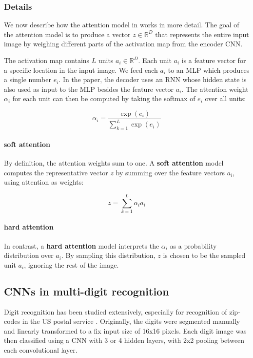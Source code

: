 \subsubsection{Details}
We now describe how the attention model in \cite{AttendAndTell} works in more detail.
The goal of the attention model is to produce a vector $z \in \mathbb{R}^D$ that represents the entire input image by weighing different parts of the activation map from the encoder CNN.

The activation map contains $L$ units $a_i \in \mathbb{R}^D$.
Each unit $a_i$ is a feature vector for a specific location in the input image. We feed each $a_i$ to an MLP which produces a single number $e_i$. In the paper, the decoder uses an RNN whose hidden state is also used as input to the MLP besides the feature vector $a_i$.
The attention weight $\alpha_i$ for each unit can then be computed by taking the softmax of $e_i$ over all units:

\[
\alpha_i = \frac{ \exp(e_i) }{ \sum_{k=1}^L \exp(e_i) }
\]

\paragraph{soft attention}
By definition, the attention weights sum to one. A \textbf{soft attention} model computes the representative vector $z$ by summing over the feature vectors $a_i$, using attention as weights:

\[
z = \sum_{k=1}^L \alpha_i a_i
\]

\paragraph{hard attention}
In contrast, a \textbf{hard attention} model interprets the $\alpha_i$ as a probability distribution over $a_i$. By sampling this distribution, $z$ is chosen to be the sampled unit $a_i$, ignoring the rest of the image.


\subsection{CNNs in multi-digit recognition}

Digit recognition has been studied extensively, especially for recognition of zip-codes in the US postal service \cite{lecun_1989, lecun_1990}. Originally, the digits were segmented manually and linearly transformed to a fix input size of 16x16 pixels.
Each digit image was then classified using a CNN with 3 or 4 hidden layers, with 2x2 pooling between each convolutional layer.

